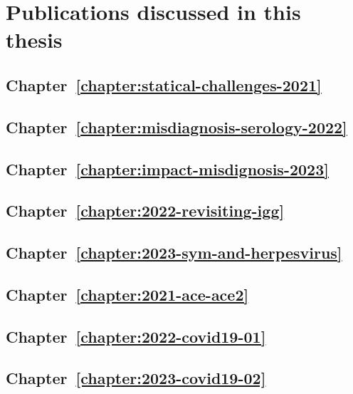 \chapter{Publications discussed in this thesis}
\label{appendix:publications}

\section{Chapter~\ref{chapter:statical-challenges-2021}}


\section{Chapter~\ref{chapter:misdiagnosis-serology-2022}}


\section{Chapter~\ref{chapter:impact-misdignosis-2023}}


\section{Chapter~\ref{chapter:2022-revisiting-igg}}


\section{Chapter~\ref{chapter:2023-sym-and-herpesvirus}}


\section{Chapter~\ref{chapter:2021-ace-ace2}}


\section{Chapter~\ref{chapter:2022-covid19-01}}


\section{Chapter~\ref{chapter:2023-covid19-02}}

